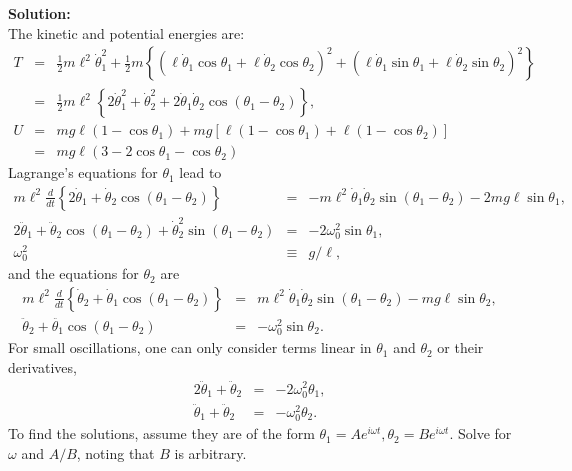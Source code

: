 {\bf Solution:}\\ The kinetic and potential energies are:
\begin{eqnarray*}
T&=&\frac{1}{2}m\ell^2\dot{\theta}_1^2
+\frac{1}{2}m\left\{(\ell\dot{\theta}_1\cos\theta_1+\ell\dot{\theta}_2\cos\theta_2)^2
+(\ell\dot{\theta}_1\sin\theta_1+\ell\dot{\theta}_2\sin\theta_2)^2\right\}\\ &=&\frac{1}{2}m\ell^2\left\{2\dot{\theta}_1^2+\dot{\theta}_2^2+2\dot{\theta}_1\dot{\theta}_2\cos(\theta_1-\theta_2)
\right\},\\ U&=&mg\ell(1-\cos\theta_1)+mg\left[\ell(1-\cos\theta_1)+\ell(1-\cos\theta_2)\right]\\ &=&mg\ell(3-2\cos\theta_1-\cos\theta_2)
\end{eqnarray*}
Lagrange's equations for $\theta_1$ lead to
\begin{eqnarray*}
m\ell^2\frac{d}{dt}\left\{2\dot{\theta}_1+\dot{\theta}_2\cos(\theta_1-\theta_2)\right\}&=&
-m\ell^2\dot{\theta}_1\dot{\theta}_2\sin(\theta_1-\theta_2)
-2mg\ell\sin\theta_1,\\ 2\ddot{\theta}_1+\ddot{\theta}_2\cos(\theta_1-\theta_2)+\dot{\theta}_2^2\sin(\theta_1-\theta_2)
&=&-2\omega_0^2\sin\theta_1,\\ \omega_0^2&\equiv& g/\ell,
\end{eqnarray*}
and the equations for $\theta_2$ are
\begin{eqnarray*}
m\ell^2\frac{d}{dt}\left\{\dot{\theta}_2+\dot{\theta}_1\cos(\theta_1-\theta_2)\right\}&=&
m\ell^2\dot{\theta}_1\dot{\theta}_2\sin(\theta_1-\theta_2)-mg\ell\sin\theta_2,\\ \ddot{\theta}_2+\ddot{\theta_1}\cos(\theta_1-\theta_2)&=&
-\omega_0^2\sin\theta_2.
\end{eqnarray*}
For small oscillations, one can only consider terms linear in
$\theta_1$ and $\theta_2$ or their derivatives,
\begin{eqnarray}
\label{eq:doublependulum}
2\ddot{\theta}_1+\ddot{\theta}_2&=&-2\omega_0^2\theta_1,\\ \nonumber
\ddot{\theta}_1+\ddot{\theta}_2&=&-\omega_0^2\theta_2.
\end{eqnarray}
To find the solutions, assume they are of the form
$\theta_1=Ae^{i\omega t}, \theta_2=Be^{i\omega t}$. Solve for $\omega$
and $A/B$, noting that $B$ is arbitrary.

